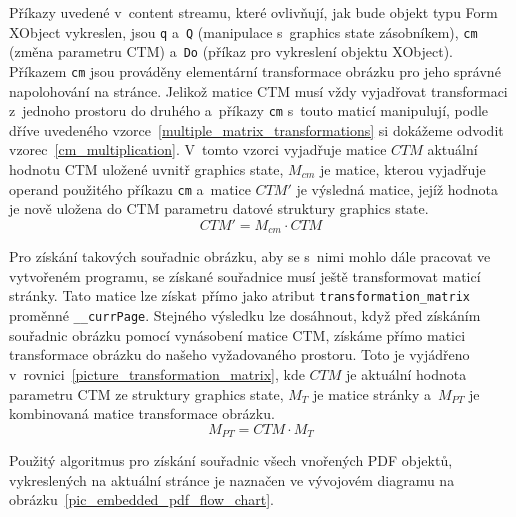 Příkazy uvedené
v~content streamu, které ovlivňují, jak bude objekt typu Form XObject vykreslen,
jsou \texttt{q} a~\texttt{Q} (manipulace s~graphics state zásobníkem),
\texttt{cm} (změna parametru CTM) a~\texttt{Do} (příkaz pro vykreslení
objektu XObject). Příkazem \texttt{cm} jsou prováděny elementární transformace
obrázku pro jeho správné napolohování na stránce. Jelikož matice CTM musí vždy
vyjadřovat transformaci z~jednoho prostoru do druhého a~příkazy \texttt{cm}
s~touto maticí manipulují, podle dříve uvedeného
vzorce~\eqref{multiple_matrix_transformations} si dokážeme odvodit
vzorec~\eqref{cm_multiplication}. V~tomto vzorci vyjadřuje matice $CTM$
aktuální hodnotu CTM uložené uvnitř graphics state, $M_{cm}$ 
je matice, kterou vyjadřuje operand použitého příkazu \texttt{cm}
a~matice $CTM'$ je výsledná matice, jejíž hodnota je nově uložena do
CTM parametru datové struktury graphics state.
\begin{equation} \label{cm_multiplication}
    CTM' = M_{cm} \cdot CTM
\end{equation}

Pro získání takových souřadnic obrázku, aby se s~nimi mohlo dále pracovat
ve vytvořeném programu, se získané souřadnice musí ještě transformovat
maticí stránky. Tato matice lze získat přímo jako atribut
\texttt{transformation\_matrix} proměnné \texttt{\_\_currPage}.
Stejného výsledku lze dosáhnout, když před získáním souřadnic obrázku pomocí
vynásobení matice CTM, získáme přímo matici transformace obrázku do našeho
vyžadovaného prostoru. Toto je vyjádřeno
v~rovnici~\eqref{picture_transformation_matrix}, kde $CTM$ je aktuální hodnota
parametru CTM ze struktury graphics state, $M_T$ je matice stránky a~$M_{PT}$
je kombinovaná matice transformace obrázku.
\begin{equation} \label{picture_transformation_matrix}
    M_{PT} = CTM \cdot M_{T}
\end{equation}

Použitý algoritmus pro získání souřadnic všech vnořených PDF objektů,
vykreslených na aktuální stránce je naznačen ve vývojovém diagramu na
obrázku~\ref{pic_embedded_pdf_flow_chart}.

